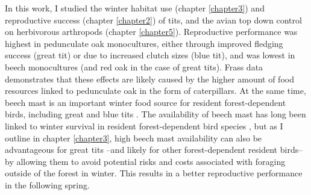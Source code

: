 \documentclass[10pt, twoside]{book} %
\begin{document}
	In this work, I studied the winter habitat use (chapter \ref{chapter3}) and reproductive success (chapter \ref{chapter2}) of tits, and the avian top down control on herbivorous arthropods (chapter \ref{chapter5}). Reproductive performance was highest in pedunculate oak monocultures, either through improved fledging success (great tit) or due to increased clutch sizes (blue tit), and was lowest in beech monocultures (and red oak in the case of great tits). Frass data demonstrates that these effects are likely caused by the higher amount of food resources linked to pedunculate oak in the form of caterpillars. At the same time, beech mast is an important winter food source for resident forest-dependent birds, including great and blue tits \citep{Perdeck2000, Chamberlain2007}. The availability of beech mast has long been linked to winter survival in resident forest-dependent bird species \citep{Kallander1981, Perdeck2000, Bouwhuis2015}, but as I outline in chapter \ref{chapter3}, high beech mast availability can also be advantageous for great tits --and likely for other forest-dependent resident birds-- by allowing them to avoid potential risks and costs associated with foraging outside of the forest in winter. This results in a better reproductive performance in the following spring.\\
	
\end{document}
